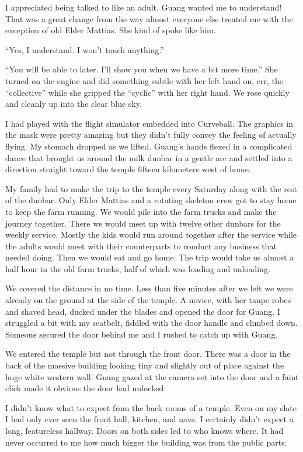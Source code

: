 I appreciated being talked to like an adult. Guang wanted me to understand! That was a great change from the way almost everyone else treated me with the exception of old Elder Mattias. She kind of spoke like him.

``Yes, I understand. I won't touch anything.''

``You will be able to later. I'll show you when we have a bit more time.'' She turned on the engine and did something subtle with her left hand on, err, the ``collective'' while she gripped the ``cyclic'' with her right hand. We rose quickly and cleanly up into the clear blue sky.

I had played with the flight simulator embedded into Curveball. The graphics in the mask were pretty amazing but they didn't fully convey the feeling of actually flying. My stomach dropped as we lifted. Guang's hands flexed in a complicated dance that brought us around the milk dunbar in a gentle arc and settled into a direction straight toward the temple fifteen kilometers west of home.

My family had to make the trip to the temple every Saturday along with the rest of the dunbar. Only Elder Mattias and a rotating skeleton crew got to stay home to keep the farm running. We would pile into the farm trucks and make the journey together. There we would meet up with twelve other dunbars for the weekly service. Mostly the kids would run around together after the service while the adults would meet with their counterparts to conduct any business that needed doing. Then we would eat and go home. The trip would take us almost a half hour in the old farm trucks, half of which was loading and unloading.

We covered the distance in no time. Less than five minutes after we left we were already on the ground at the side of the temple. A novice, with her taupe robes and shaved head, ducked under the blades and opened the door for Guang. I struggled a bit with my seatbelt, fiddled with the door handle and climbed down. Someone secured the door behind me and I rushed to catch up with Guang.

We entered the temple but not through the front door. There was a door in the back of the massive building looking tiny and slightly out of place against the huge white western wall. Guang gazed at the camera set into the door and a faint click made it obvious the door had unlocked.

I didn't know what to expect from the back rooms of a temple. Even on my slate I had only ever seen the front hall, kitchen, and nave. I certainly didn't expect a long, featureless hallway. Doors on both sides led to who knows where. It had never occurred to me how much bigger the building was from the public parts.

